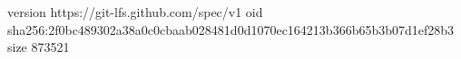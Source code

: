 version https://git-lfs.github.com/spec/v1
oid sha256:2f0bc489302a38a0c0cbaab028481d0d1070ec164213b366b65b3b07d1ef28b3
size 873521

